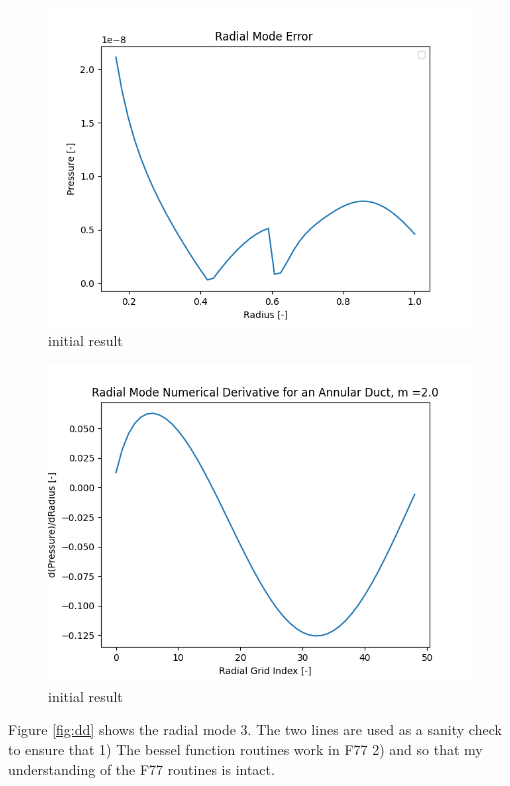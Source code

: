 \documentclass[12pt]{article}
\begin{document}
\begin{figure}
    \centering
    \includegraphics{../figures/Figure1error.png}
    \caption{initial result}
    \label{fig:d}
\end{figure}

\begin{figure}
    \centering
    \includegraphics{../figures/Figure1deriv.png}
    \caption{initial result}
    \label{fig:d}
\end{figure}

Figure \ref{fig:dd} shows the radial mode 3. The two lines are used as a sanity 
check to ensure that 1) The bessel function routines work in F77 2) and so that 
my understanding of the F77 routines is intact. 
\end{document}
